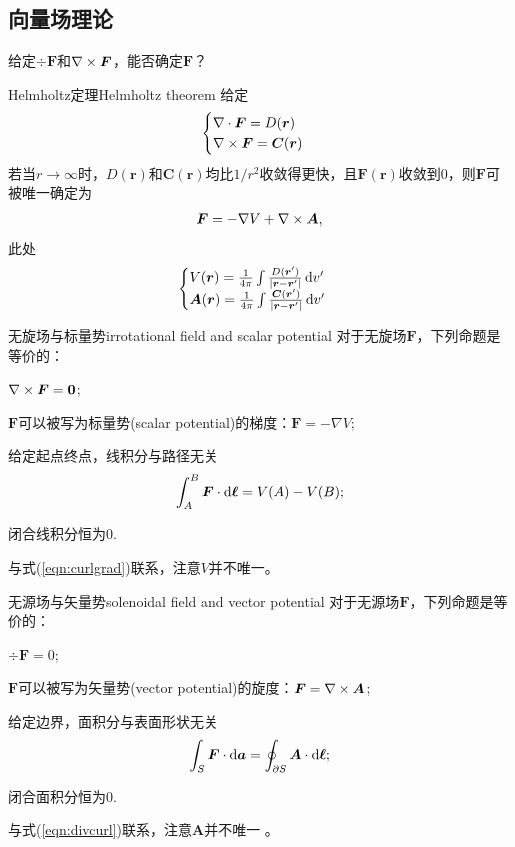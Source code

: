 \subsection{向量场理论}
给定$\div\bm F$和$\nabla\times\bm F$，能否确定$\bm F$？
\begin{theorem}{Helmholtz定理}{Helmholtz theorem}
    给定
    \[
        \begin{cases}
            \nabla\cdot\bm F=D(\bm r)\\
            \nabla\times\bm F=\bm C(\bm r)
        \end{cases}
    \]
    若当$r\to\infty$时，$D(\bm r)$和$\bm C(\bm r)$均比$1/r^2$收敛得更快，且$\bm F(\bm r)$收敛到0，则$\bm F$可被唯一确定为
    \begin{align}
        \bm F=-\nabla V+\nabla\times\bm A,
    \end{align}
    此处
    \begin{align}
        \begin{cases}
            V(\bm r)=\frac1{4\pi}\int\frac{D(\bm r')}{|\bm r-\bm r'|}\mathop{}\!\mathrm{d} v'\\
            \bm A(\bm r)=\frac1{4\pi}\int\frac{\bm C(\bm r')}{|\bm r-\bm r'|}\mathop{}\!\mathrm{d} v'
        \end{cases}
    \end{align}
\end{theorem}
\begin{theorem}{无旋场与标量势}{irrotational field and scalar potential}
    对于无旋场$\bm F$，下列命题是等价的：
    \begin{compactitem}
        \item $\nabla\times\bm F=\bm 0$;
        \item $\bm F$可以被写为标量势(scalar potential)的梯度：$\bm F=-\nabla V$;
        \item 给定起点终点，线积分与路径无关\[
            \int_A^B\bm F\cdot\mathop{}\!\mathrm{d}\bm\ell=V(A)-V(B);
        \]
        \item 闭合线积分恒为0.
    \end{compactitem}
\end{theorem}
与式(\ref{eqn:curlgrad})联系，注意$V$并不唯一。
\begin{theorem}{无源场与矢量势}{solenoidal field and vector potential}
    对于无源场$\bm F$，下列命题是等价的：
    \begin{compactitem}
        \item $\div\bm F=0$;
        \item $\bm F$可以被写为矢量势(vector potential)的旋度：$\bm F=\nabla\times\bm A$;
        \item 给定边界，面积分与表面形状无关\[
            \int_S\bm F\cdot\mathop{}\!\mathrm{d}\bm a=\oint_{\partial S}\bm A\cdot\mathop{}\!\mathrm{d}\bm\ell;
        \]
        \item 闭合面积分恒为0.
    \end{compactitem}
\end{theorem}
与式(\ref{eqn:divcurl})联系，注意$\bm A$并不唯一 。
\clearpage
